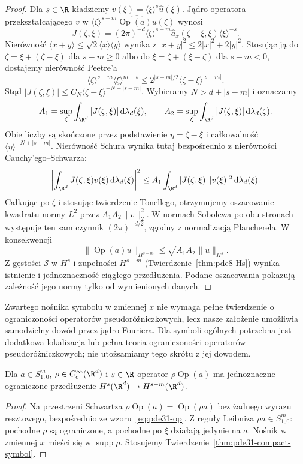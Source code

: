 \begin{proof}
Dla $s\in\R$ kładziemy
$v(\xi)=\langle\xi\rangle^s\widehat u(\xi)$.
Jądro operatora przekształcającego $v$ w
$\langle\zeta\rangle^{s-m}\widehat{\operatorname{Op}(a)u}(\zeta)$
wynosi
\[
 J(\zeta,\xi)=(2\pi)^{-d}\langle\zeta\rangle^{s-m}
 \widehat a_x(\zeta-\xi,\xi)\langle\xi\rangle^{-s}.
\]
Nierówność $\langle x+y\rangle\le
\sqrt2\langle x\rangle\langle y\rangle$
wynika z $|x+y|^2\le2|x|^2+2|y|^2$.
Stosując ją do $\zeta=\xi+(\zeta-\xi)$
dla $s-m\ge0$ albo do
$\xi=\zeta+(\xi-\zeta)$ dla $s-m<0$,
dostajemy nierówność Peetre'a
\[
 \langle\zeta\rangle^{s-m}\langle\xi\rangle^{m-s}
 \le2^{|s-m|/2}\langle\zeta-\xi\rangle^{|s-m|}.
\]
Stąd $|J(\zeta,\xi)|\le
C_N\langle\zeta-\xi\rangle^{-N+|s-m|}$.
Wybieramy $N>d+|s-m|$ i oznaczamy
\[
 A_1=\sup_\zeta\int_{\R^d}|J(\zeta,\xi)|
 \,\mathrm d\lambda_d(\xi),\qquad
 A_2=\sup_\xi\int_{\R^d}|J(\zeta,\xi)|
 \,\mathrm d\lambda_d(\zeta).
\]
Obie liczby są skończone przez podstawienie
$\eta=\zeta-\xi$ i całkowalność
$\langle\eta\rangle^{-N+|s-m|}$.
Nierówność Schura wynika tutaj bezpośrednio
z nierówności Cauchy'ego--Schwarza:
\[
 \left|\int_{\R^d}J(\zeta,\xi)v(\xi)
 \,\mathrm d\lambda_d(\xi)\right|^2
 \le A_1\int_{\R^d}|J(\zeta,\xi)|\,|v(\xi)|^2
 \,\mathrm d\lambda_d(\xi).
\]
Całkując po $\zeta$ i stosując twierdzenie Tonellego,
otrzymujemy oszacowanie kwadratu normy $L^2$
przez $A_1A_2\|v\|_2^2$.
W normach Sobolewa po obu stronach występuje
ten sam czynnik $(2\pi)^{-d/2}$, zgodny z
normalizacją Plancherela. W konsekwencji
\[
 \|\operatorname{Op}(a)u\|_{H^{s-m}}
 \le\sqrt{A_1A_2}\|u\|_{H^s}.
\]
Z gęstości $\mathcal S$ w $H^s$ i zupełności
$H^{s-m}$ (Twierdzenie~\ref{thm:pde8-Hs})
wynika istnienie i jednoznaczność ciągłego
przedłużenia. Podane oszacowania pokazują
zależność jego normy tylko od wymienionych danych.
\end{proof}

\begin{uwaga}
Zwartego nośnika symbolu w zmiennej $x$ nie wymaga pełne
twierdzenie o ograniczoności operatorów pseudoróżniczkowych,
lecz nasze założenie umożliwia samodzielny dowód przez jądro Fouriera.
Dla symboli ogólnych potrzebna jest dodatkowa lokalizacja
lub pełna teoria ograniczoności operatorów pseudoróżniczkowych;
nie utożsamiamy tego skrótu z jej dowodem.
\end{uwaga}

\begin{wniosek}
\label{cor:pde31-local-sobolev}
Dla $a\in S^m_{1,0}$, $\rho\in C_c^\infty(\R^d)$
i $s\in\R$ operator $\rho\operatorname{Op}(a)$
ma jednoznaczne ograniczone przedłużenie
$H^s(\R^d)\to H^{s-m}(\R^d)$.
\end{wniosek}
\begin{proof}
Na przestrzeni Schwartza
$\rho\operatorname{Op}(a)=\operatorname{Op}(\rho a)$
bez żadnego wyrazu resztowego, bezpośrednio
ze wzoru~\eqref{eq:pde31-op}.
Z reguły Leibniza $\rho a\in S^m_{1,0}$:
pochodne $\rho$ są ograniczone, a pochodne
po $\xi$ działają jedynie na $a$.
Nośnik w zmiennej $x$ mieści się w
$\operatorname{supp}\rho$. Stosujemy
Twierdzenie~\ref{thm:pde31-compact-symbol}.
\end{proof}

